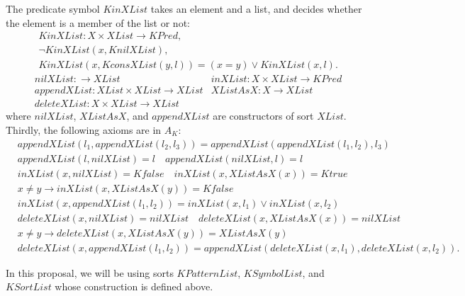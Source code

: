 \documentclass[UTF8,11pt]{article}
\theoremstyle{plain}
\theoremstyle{definition}
\theoremstyle{remark}
\newcommand{\KPred}{\mathit{KPred}}
\newcommand{\Ktrue}{\mathit{Ktrue}}
\newcommand{\Kfalse}{\mathit{Kfalse}}
\newcommand{\XList}{\mathit{XList}}
\newcommand{\KnilXList}{\mathit{KnilXList}}
\newcommand{\KconsXList}{\mathit{KconsXList}}
\newcommand{\KinXList}{\mathit{KinXList}}
\newcommand{\KSortList}{\mathit{KSortList}}
\newcommand{\KSymbolList}{\mathit{KSymbolList}}
\newcommand{\KPatternList}{\mathit{KPatternList}}
\begin{document}
The predicate symbol $\KinXList$ takes an element and a list, and decides whether the element is a member of the list or not:
\begin{align*}
  & \KinXList \colon \mathit{X} \times \XList \to \KPred,
  \\
  & \neg \KinXList(x, \KnilXList),
  \\
  & \KinXList(x, \KconsXList(y, l)) = (x = y) \vee \KinXList(x, l).
\end{align*}
\begin{align*}
&\mathit{nilXList} \colon \to \mathit{XList}
&\mathit{inXList} \colon \mathit{X} \times \mathit{XList} \to \KPred
\\
&\mathit{appendXList} \colon \mathit{XList} \times \mathit{XList} \to 
\mathit{XList}
&\mathit{XListAsX} \colon \mathit{X} \to \mathit{XList}
\\
&\mathit{deleteXList} \colon \mathit{X} \times \mathit{XList} \to \mathit{XList}
\end{align*}
where $\mathit{nilXList}$, $\mathit{XListAsX}$, and $\mathit{appendXList}$ are constructors of sort $\mathit{XList}$.
Thirdly, the following axioms are in $A_K$:
\begin{align*}
&\mathit{appendXList}(l_1, \mathit{appendXList}(l_2, l_3)) = \mathit{appendXList}(\mathit{appendXList}(l_1, l_2), l_3)
\\
&\mathit{appendXList}(l, \mathit{nilXList}) = l
\quad \mathit{appendXList}(\mathit{nilXList}, l) = l
\\
&\mathit{inXList}(x, \mathit{nilXList}) = \Kfalse
\quad \mathit{inXList}(x, \mathit{XListAsX}(x)) = \Ktrue
\\
&x \neq y \to \mathit{inXList}(x, \mathit{XListAsX}(y)) = \Kfalse
\\
&\mathit{inXList}(x, \mathit{appendXList}(l_1, l_2)) = \mathit{inXList}(x, l_1) \vee \mathit{inXList}(x, l_2)
\\
&\mathit{deleteXList}(x, \mathit{nilXList}) = \mathit{nilXList}
\quad \mathit{deleteXList}(x, \mathit{XListAsX}(x)) = \mathit{nilXList}
\\
&x \neq y \to \mathit{deleteXList}(x, \mathit{XListAsX}(y)) = \mathit{XListAsX}(y)
\\
&\mathit{deleteXList}(x, \mathit{appendXList}(l_1, l_2)) = \mathit{appendXList}(\mathit{deleteXList}(x, l_1), \mathit{deleteXList}(x, l_2)).
\end{align*}

In this proposal, we will be using sorts $\KPatternList$, $\KSymbolList$, and $\KSortList$ whose construction is defined above. 
\end{document}
